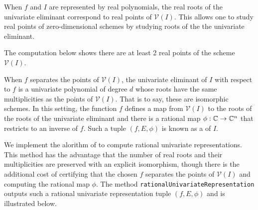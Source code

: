 %
\begin{leftbar}

\end{leftbar}
%

When $f$ and $I$ are represented by real polynomials, the real roots of the univariate eliminant correspond to real points of $\mathcal{V}(I)$. This allows one to study real points of zero-dimensional schemes by studying roots of the the univariate eliminant. 

The computation below shows there are at least 2 real points of the scheme $\mathcal{V}(I)$. 

%
\begin{leftbar}

\end{leftbar}
%

When $f$ separates the points of $\mathcal{V}(I)$, the univariate eliminant of $I$ with respect to $f$ is a univariate polynomial of degree $d$ whose roots have the same multiplicities as the points of $\mathcal{V}(I)$. That is to say, these are isomorphic schemes. In this setting, the function $f$ defines a map from $\mathcal{V}(I)$ to the roots of the roots of the univariate eliminant and there is a rational map $\phi:\mathbb{C}\to\mathbb{C}^n$ that restricts to an inverse of $f$. Such a tuple $(f,E,\phi)$ is known as a  of $I$. 

We implement the alorithm of  to compute rational univariate representations. This method has the advantage that the number of real roots and their multiplicities are preserved with an explicit isomorphism, though there is the additional cost of certifying that the chosen $f$ separates the points of $\mathcal{V}(I)$ and computing the rational map $\phi$. The method \texttt{rationalUnivariateRepresentation} outputs such a rational univariate representation tuple $(f,E,\phi)$ and is illustrated below.

%
\begin{leftbar}

\end{leftbar}
%
